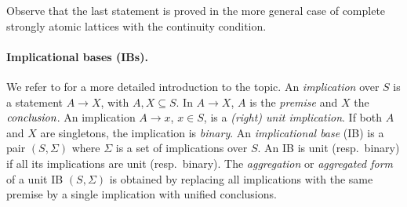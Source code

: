 \documentclass[12pt, a4paper]{article}
\newcommand{\U}{S}  %
\newcommand{\imp}{\rightarrow}  %
\newcommand{\is}{\Sigma}  %
\begin{document}
Observe that the last statement is proved in the more general case of complete strongly atomic lattices with the continuity condition.

\paragraph{Implicational bases (IBs).} 
We refer to \cite{bertet2018lattices,wild2017joy} for a more detailed introduction to the topic.
An \emph{implication} over $\U$ is a statement $A \imp X$, with $A, X \subseteq \U$.
In $A \imp X$, $A$ is the \emph{premise} and $X$ the $\emph{conclusion}$.
An implication $A \imp x$, $x \in \U$, is a \emph{(right) unit implication}.
If both $A$ and $X$ are singletons, the implication is \emph{binary}.
An \emph{implicational base} (IB) is a pair $(\U, \is)$ where $\is$ is a set of implications over $\U$.
An IB is unit (resp.~binary) if all its implications are unit (resp.~binary).
The \emph{aggregation} or \emph{aggregated form} of a unit IB $(\U, \is)$ is obtained by replacing all implications with the same premise by a single implication with unified conclusions.
\end{document}
